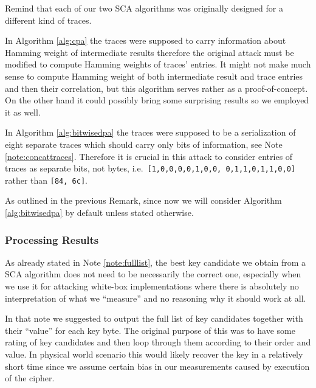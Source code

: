 \begin{remark}
\label{rem:traceformat}
	Remind that each of our two SCA algorithms was originally designed for a different kind of traces.
	
	In Algorithm \ref{alg:cpa} the traces were supposed to carry information about Hamming weight of intermediate results therefore the original attack must be modified to compute Hamming weights of traces' entries. It might not make much sense to compute Hamming weight of both intermediate result and trace entries and then their correlation, but this algorithm serves rather as a proof-of-concept. On the other hand it could possibly bring some surprising results so we employed it as well.
	
	In Algorithm \ref{alg:bitwisedpa} the traces were supposed to be a serialization of eight separate traces which should carry only bits of information, see Note \ref{note:concattraces}. Therefore it is crucial in this attack to consider entries of traces as separate bits, not bytes, i.e.\ {\tt [1,0,0,0,0,1,0,0, 0,1,1,0,1,1,0,0]} rather than {\tt [84, 6c]}.
\end{remark}

As outlined in the previous Remark, since now we will consider Algorithm \ref{alg:bitwisedpa} by default unless stated otherwise.

\subsubsection{Processing Results}
	
	As already stated in Note \ref{note:fulllist}, the best key candidate we obtain from a SCA algorithm does not need to be necessarily the correct one, especially when we use it for attacking white-box implementations where there is absolutely no interpretation of what we ``measure'' and no reasoning why it should work at all.
	
	In that note we suggested to output the full list of key candidates together with their ``value'' for each key byte. The original purpose of this was to have some rating of key candidates and then loop through them according to their order and value. In physical world scenario this would likely recover the key in a relatively short time since we assume certain bias in our measurements caused by execution of the cipher.
	
